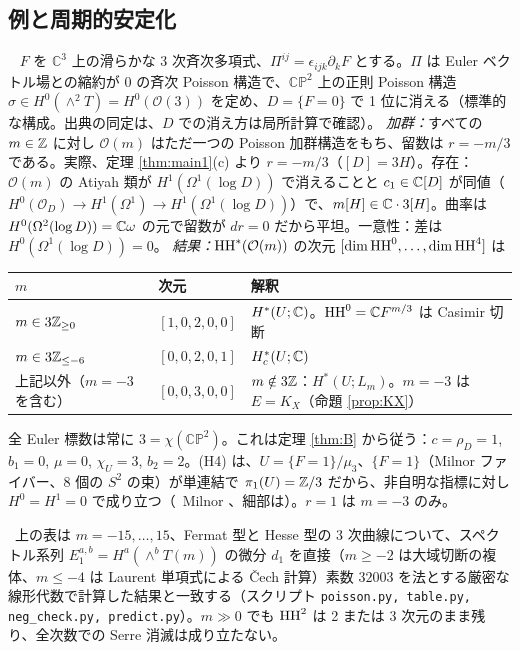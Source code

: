 \subsection{例と周期的安定化}
\begin{ex}\tP\ \tV\label{ex:cp2}
$F$ を $\mathbb C^3$ 上の滑らかな 3 次斉次多項式、$\Pi^{ij}=\epsilon_{ijk}\partial_kF$ とする。$\Pi$ は Euler ベクトル場との縮約が 0 の斉次 Poisson 構造で、$\mathbb{CP}^2$ 上の正則 Poisson 構造 $\sigma\in H^0(\wedge^2T)=H^0(\mathcal O(3))$ を定め、$D=\{F=0\}$ で 1 位に消える（標準的な構成。出典の同定は\tQ、$D$ での消え方は局所計算で確認）。
\emph{加群：}すべての $m\in\mathbb Z$ に対し $\mathcal O(m)$ はただ一つの Poisson 加群構造をもち、留数は $r=-m/3$ である。実際、定理 \ref{thm:main1}(c) より $r=-m/3$（$[D]=3H$）。存在：$\mathcal O(m)$ の Atiyah 類が $H^1(\Omega^1(\log D))$ で消えることと $c_1\in\mathbb C[D]$ が同値（$H^0(\mathcal O_D)\to H^1(\Omega^1)\to H^1(\Omega^1(\log D))$）で、$m[H]\in\mathbb C\cdot3[H]$。曲率は $H^0(\Omega^2(\log D))=\mathbb C\omega$ の元で留数が $dr=0$ だから平坦。一意性：差は $H^0(\Omega^1(\log D))=0$。
\emph{結果：}$\mathrm{HH}^*(\mathcal O(m))$ の次元 $[\dim\mathrm{HH}^0,\dots,\dim\mathrm{HH}^4]$ は
\begin{center}\small
\begin{tabular}{lll}\toprule
$m$ & 次元 & 解釈\\\midrule
$m\in3\mathbb Z_{\ge0}$ & $[1,0,2,0,0]$ & $H^*(U;\mathbb C)$。$\mathrm{HH}^0=\mathbb C F^{m/3}$ は Casimir 切断\\
$m\in3\mathbb Z_{\le-6}$ & $[0,0,2,0,1]$ & $H^*_c(U;\mathbb C)$\\
上記以外（$m=-3$ を含む） & $[0,0,3,0,0]$ & $m\notin3\mathbb Z$：$H^*(U;L_m)$。$m=-3$ は $E=K_X$（命題 \ref{prop:KX}）\\\bottomrule
\end{tabular}
\end{center}
全 Euler 標数は常に $3=\chi(\mathbb{CP}^2)$。これは定理 \ref{thm:B} から従う：$c=\rho_D=1$, $b_1=0$, $\mu=0$, $\chi_U=3$, $b_2=2$。(H4) は、$U=\{F=1\}/\mu_3$、$\{F=1\}$（Milnor ファイバー、$8$ 個の $S^2$ の束）が単連結で $\pi_1(U)=\mathbb Z/3$ だから、非自明な指標に対し $H^0=H^1=0$ で成り立つ（\tC\ Milnor \cite{Milnor}、細部は\tQ）。$r=1$ は $m=-3$ のみ。
\end{ex}
\tV\ 上の表は $m=-15,\dots,15$、Fermat 型と Hesse 型の 3 次曲線について、スペクトル系列 $E_1^{a,b}=H^a(\wedge^bT(m))$ の微分 $d_1$ を直接（$m\ge-2$ は大域切断の複体、$m\le-4$ は Laurent 単項式による \v Cech 計算）素数 $32003$ を法とする厳密な線形代数で計算した結果と一致する（スクリプト \texttt{poisson.py, table.py, neg\_check.py, predict.py}）。$m\gg0$ でも $\mathrm{HH}^2$ は 2 または 3 次元のまま残り、全次数での Serre 消滅は成り立たない。

